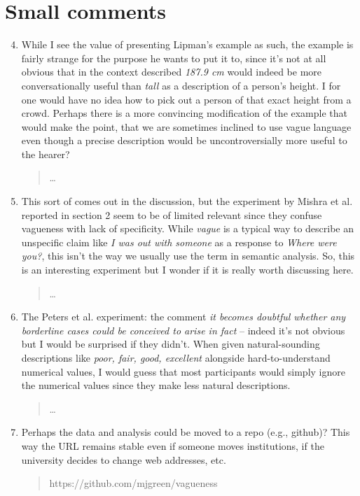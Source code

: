 \documentclass{tufte-handout}
\begin{document}
\section{Small comments}

\begin{enumerate}\setcounter{enumi}{3}

\item While I see the value of presenting Lipman's example as such, the example is fairly strange for the purpose he wants to put it to, since it's not at all obvious that in the context described \emph{187.9 cm} would indeed be more conversationally useful than \emph{tall} as a description of a person's height. I for one would have no idea how to pick out a person of that exact height from a crowd. Perhaps there is a more convincing modification of the example that would make the point, that we are sometimes inclined to use vague language even though a precise description would be uncontroversially more useful to the hearer?
\begin{quote}\ldots\end{quote}

\item This sort of comes out in the discussion, but the experiment by Mishra et al. reported in section 2 seem to be of limited relevant since they confuse vagueness with lack of specificity. While \emph{vague} is a typical way to describe an unspecific claim like \emph{I was out with someone} as a response to \emph{Where were you?}, this isn't the way we usually use the term in semantic analysis. So, this is an interesting experiment but I wonder if it is really worth discussing here.
\begin{quote}\ldots\end{quote}

\item The Peters et al. experiment: the comment \emph{it becomes doubtful whether any borderline cases could be conceived to arise in fact} -- indeed it's not obvious but I would be surprised if they didn't. When given natural-sounding descriptions like \emph{poor, fair, good, excellent} alongside hard-to-understand numerical values, I would guess that most participants would simply ignore the numerical values since they make less natural descriptions.
\begin{quote}\ldots\end{quote}

\item Perhaps the data and analysis could be moved to a repo (e.g., github)? This way the URL remains stable even if someone moves institutions, if the university decides to change web addresses, etc. 
\begin{quote}https://github.com/mjgreen/vagueness\end{quote}


\end{enumerate}
\end{document}
